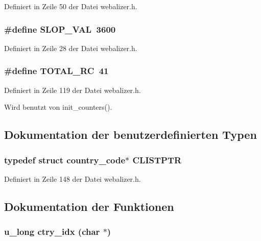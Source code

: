 Definiert in Zeile 50 der Datei webalizer.h.
\subsubsection{\setlength{\rightskip}{0pt plus 5cm}\#define SLOP\_\-VAL~3600}\label{webalizer_8h_557769cbf6a29c118bc171bd836c8622}




Definiert in Zeile 28 der Datei webalizer.h.
\subsubsection{\setlength{\rightskip}{0pt plus 5cm}\#define TOTAL\_\-RC~41}\label{webalizer_8h_774b57757b20d74727ecde0388a020b6}




Definiert in Zeile 119 der Datei webalizer.h.

Wird benutzt von init\_\-counters().

\subsection{Dokumentation der benutzerdefinierten Typen}
\subsubsection{\setlength{\rightskip}{0pt plus 5cm}typedef struct {\bf country\_\-code}$\ast$ {\bf CLISTPTR}}\label{webalizer_8h_3502d3057324fbd3bc3f7c0b0e6777bf}




Definiert in Zeile 148 der Datei webalizer.h.

\subsection{Dokumentation der Funktionen}
\subsubsection{\setlength{\rightskip}{0pt plus 5cm}u\_\-long ctry\_\-idx (char $\ast$)}\label{webalizer_8h_6efa2454167aed5a5ea10455b758f77e}




